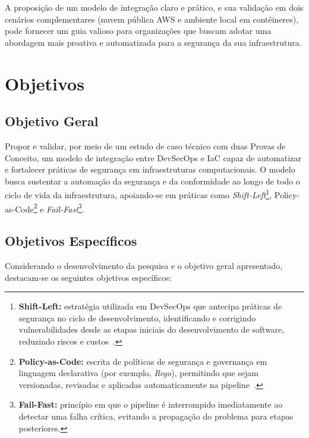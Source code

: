 A proposição de um modelo de integração claro e prático, e sua validação em dois cenários complementares (nuvem pública AWS e ambiente local em contêineres), pode fornecer um guia valioso para organizações que buscam adotar uma abordagem mais proativa e automatizada para a segurança da sua infraestrutura.

\section{Objetivos}

\subsection{Objetivo Geral}

Propor e validar, por meio de um estudo de caso técnico com duas Provas de Conceito, um modelo de integração entre DevSecOps e IaC capaz de automatizar e fortalecer práticas de segurança em infraestruturas computacionais. O modelo busca sustentar a automação da segurança e da conformidade ao longo de todo o ciclo de vida da infraestrutura, apoiando-se em práticas como \textit{Shift-Left}\footnote{\textbf{Shift-Left:} estratégia utilizada em DevSecOps que antecipa práticas de segurança no ciclo de desenvolvimento, identificando e corrigindo vulnerabilidades desde as etapas iniciais do desenvolvimento de software, reduzindo riscos e custos~.}, Policy-as-Code\footnote{\textbf{Policy-as-Code:} escrita de políticas de segurança e governança em linguagem declarativa (por exemplo, \textit{Rego}), permitindo que sejam versionadas, revisadas e aplicadas automaticamente na pipeline~.} e \textit{Fail-Fast}\footnote{\textbf{Fail-Fast:} princípio em que o pipeline é interrompido imediatamente ao detectar uma falha crítica, evitando a propagação do problema para etapas posteriores.}.

\subsection{Objetivos Específicos}

Considerando o desenvolvimento da pesquisa e o objetivo geral apresentado, destacam-se os seguintes objetivos específicos:

